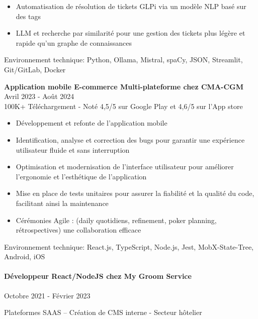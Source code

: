 \documentclass{article}
\begin{document}
\raggedright 
\begin{itemize}
  \item{Automatisation de résolution de tickets GLPi via un modèle NLP basé sur des tags}
  \item{LLM et recherche par similarité pour une gestion des tickets plus légère et rapide qu’un graphe de connaissances}
\end{itemize}
\noindent
\vspace{1ex}
Environnement technique: Python, Ollama, Mistral, spaCy, JSON, Streamlit, Git/GitLab, Docker

\noindent
\textbf{Application mobile E-commerce Multi-plateforme chez CMA-CGM} \hspace*{\fill}Avril 2023 - Août 2024  \\
100K+ Téléchargement - Noté 4,5/5 sur Google Play et 4,6/5 sur l'App store

\raggedright  
\begin{itemize}
  \item{Développement et refonte de l’application mobile}
  \item{Identification, analyse et correction des bugs pour garantir une expérience utilisateur fluide et
    sans interruption}
  \item{Optimisation et modernisation de l'interface utilisateur pour améliorer l'ergonomie et l'esthétique
    de l'application}
  \item{Mise en place de tests unitaires pour assurer la fiabilité et la qualité du code, facilitant ainsi la
    maintenance}
  \item{Cérémonies Agile : (daily quotidiens, refinement, poker planning, rétrospectives) une collaboration efficace}
\end{itemize}
\noindent
Environnement technique: React.js, TypeScript, Node.js, Jest, MobX-State-Tree, Android, iOS
\paragraph{Développeur React/NodeJS chez My Groom Service}\hspace*{\fill}Octobre 2021 - Février 2023

\noindent
Plateformes SAAS – Création de CMS interne - Secteur hôtelier \\
\end{document}

